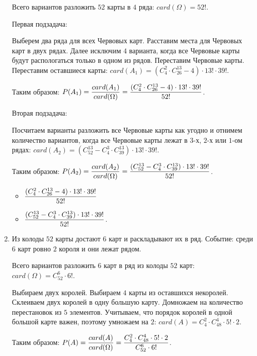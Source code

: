 \documentclass{article}
\begin{document}
\begin{enumerate}
    \solution{}
    
    Всего вариантов разложить $52$ карты в $4$ ряда: $card(\Omega) = 52!$.
    
    Первая подзадача:
    
    Выберем два ряда для всех Червовых карт. Расставим места для Червовых карт в двух рядах. Далее исключим $4$ варианта, когда все Червовые карты будут распологаться только в одном из рядов. Переставим Червовые карты. Переставим оставшиеся карты: $card(A_1) = (C_4^2 \cdot C_{26}^{13} - 4) \cdot 13! \cdot 39!$.

    Таким образом: $\displaystyle{P(A_1) = \frac{card(A_1)}{card(\Omega)} = \frac{(C_4^2 \cdot C_{26}^{13} - 4) \cdot 13! \cdot 39!}{52!}}$.

    Вторая подзадача:

    Посчитаем варианты разложить все Червовые карты как угодно и отнимем количество вариантов, когда все Червовые карты лежат в $3$-х, $2$-х или $1$-ом рядах: $card(A_2) = (C_{52}^{13} - C_4^3 \cdot C_{39}^{13}) \cdot 13! \cdot 39!$.

    Таким образом: $\displaystyle{P(A_2) = \frac{card(A_2)}{card(\Omega)} = \frac{(C_{52}^{13} - C_4^3 \cdot C_{39}^{13}) \cdot 13! \cdot 39!}{52!}}$.

    \answer{}

    \begin{itemize}
        \item $\displaystyle{\frac{(C_4^2 \cdot C_{26}^{13} - 4) \cdot 13! \cdot 39!}{52!}}$
        \item $\displaystyle{\frac{(C_{52}^{13} - C_4^3 \cdot C_{39}^{13}) \cdot 13! \cdot 39!}{52!}}$.
    \end{itemize}

    \item Из колоды $52$ карты достают $6$ карт и раскладывают их в ряд. Событие: среди $6$ карт ровно $2$ короля и они лежат рядом.

    \solution{}

    Всего вариантов разложить $6$ карт в ряд из колоды $52$ карт: $card(\Omega) = C_{52}^6 \cdot 6!$.

    Выбираем двух королей. Выбираем $4$ карты из оставшихся некоролей. Склеиваем двух королей в одну большую карту. Домножаем на количество перестановок из $5$ элементов. Учитываем, что порядок королей в одной большой карте важен, поэтому умножаем на $2$: $card(A) = C_4^2 \cdot C_{48}^{4} \cdot 5! \cdot 2$.

    Таким образом: $\displaystyle{P(A) = \frac{card(A)}{card(\Omega)} = \frac{C_4^2 \cdot C_{48}^{4} \cdot 5! \cdot 2}{C_{52}^6 \cdot 6!}}$.


\end{enumerate}
\end{document}
